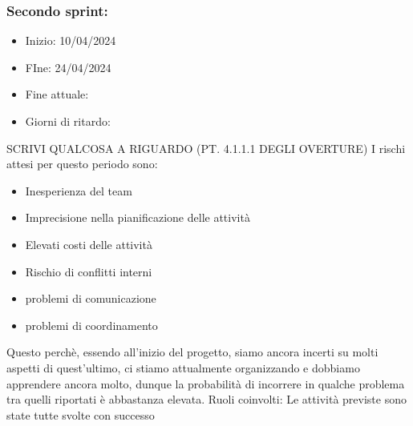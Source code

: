 \documentclass[italian,12pt]{article} %
\begin{document}
    \subsubsection{Secondo sprint:}
    \begin{itemize}
        \item Inizio: 10/04/2024
        \item FIne: 24/04/2024
        \item Fine attuale:
        \item Giorni di ritardo:
    \end{itemize}
    SCRIVI QUALCOSA A RIGUARDO (PT. 4.1.1.1 DEGLI OVERTURE)
    I rischi attesi per questo periodo sono:
    \begin{itemize}
        \item Inesperienza del team
        \item Imprecisione nella pianificazione delle attività
        \item Elevati costi delle attività
        \item Rischio di conflitti interni 
        \item problemi di comunicazione
        \item problemi di coordinamento
    \end{itemize}
    Questo perchè, essendo all’inizio del progetto, siamo ancora incerti su molti aspetti di quest’ultimo, ci stiamo attualmente organizzando e dobbiamo apprendere ancora molto, dunque la probabilità di incorrere in qualche problema tra quelli riportati è abbastanza elevata.
    Ruoli coinvolti: 
    Le attività previste sono state tutte svolte con successo
\end{document}
